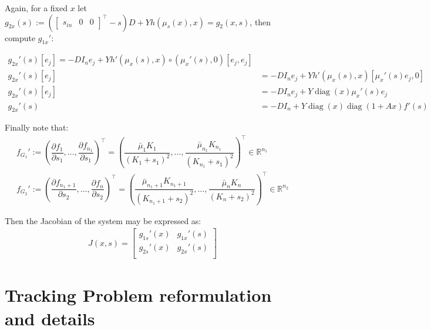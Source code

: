 \documentclass[processes,article,submit,moreauthors,pdftex]{Definitions/mdpi}
\newcommand{\R}{\mathbb{R}}
\DeclareMathOperator{\diag}{diag}
\begin{document}
Again, for a fixed $x$ let $g_{2x}(s):= \left(\begin{bmatrix} s_{in}&0&0 \end{bmatrix}^\top-s\right)D + Yh(\mu_s(x),x)=g_2(x,s)$, then compute $g_{1x}'$:

\begin{align}
g_{2x}'(s)[e_j] = -DI_ne_j + Y h'(\mu_x(s),x)\circ (\mu_x'(s),0)[e_j,e_j] \\
g_{2x}'(s)[e_j] &= -DI_ne_j + Y h'(\mu_x(s),x)[\mu_x'(s)e_j, 0] \\
g_{2x}'(s)[e_j] &= -DI_ne_j + Y \diag(x)\mu_x'(s)e_j \\
g_{2x}'(s) &= -DI_n+ Y \diag(x)\diag(1+Ax)f'(s)
\end{align} 


Finally note that:
\begin{align*}
f_{G_1}' := \left( \dfrac{\partial f_1}{\partial s_1}, \dots, \dfrac{\partial f_{n_1}}{\partial s_1} \right)^\top = \left(\dfrac{\bar{\mu}_1K_1}{(K_1 + s_1)^2},\dots, \dfrac{\bar{\mu}_{n_1}K_{n_1}}{(K_{n_1} + s_1)^2} \right)^\top \in \R^{n_1} \\
f_{G_2}' := \left( \dfrac{\partial f_{n_1+1}}{\partial s_2}, \dots, \dfrac{\partial f_{n}}{\partial s_2} \right)^\top = \left( \dfrac{\bar{\mu}_{n_1+1}K_{n_1+1}}{(K_{n_1+1} + s_2)^2},\dots, \dfrac{\bar{\mu}_{n}K_{n}}{(K_{n} + s_2)^2} \right)^\top \in \R^{n_2}
\end{align*}

Then the Jacobian of the system may be expressed as:
\begin{align}
\label{Jacobian_system}
J(x,s) = \begin{bmatrix}
g_{1s}'(x) & g_{1x}'(s) \\
g_{2s}'(x) & g_{2x}'(s) \\
\end{bmatrix} 
\end{align} 

\section{Tracking Problem reformulation and details}
\end{document}
